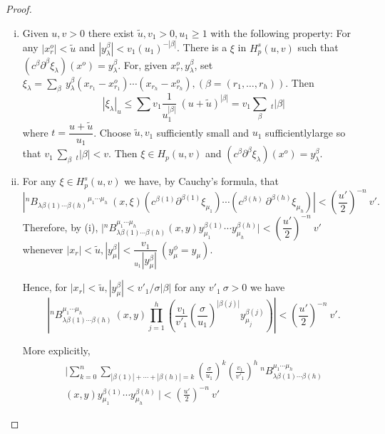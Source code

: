 \begin{proof}%
  \begin{enumerate}[(i)]
  \item Given $u, v > 0$ there exist $\tilde{u},  v_1 > 0,  u_1 \ge 1$
    with the following property: For any $| x^o_r | < \tilde{u}$ and
    $| y^\beta_\lambda | < v_1 (u_1)^{-| \beta |}$. There is a $\xi $
    in $H^s_p (u, v)$ such that $(c^\beta \partial^\beta \xi_\lambda)
    (x^o) = y^\beta_\lambda$. For,  given $x^o_r,  y^\beta_\lambda$,
    set $\xi_\lambda = \sum\limits_{\beta} ~ y_\lambda^\beta (x_{r_1}
    - x^o_{r_1}) \cdots (x_{r_h} - x^o_{r_h}),  (\beta = (r_1,
    \ldots,  r_h)) $. Then 
    $$
    | \xi_\lambda |_u \le \sum v_1 \frac{1}{u_1^{| \beta |}} ~(u +
    \tilde{u})^{| \beta |} = v_1 \sum_{\beta} ~ _t| \beta | 
    $$
    where $t = \dfrac{u + \tilde{u}}{u_1}$. Choose $\tilde{u},  v_1$
    sufficiently small and $u_1$ sufficiently\pageoriginale large so that $v_1  ~
    \sum\limits_\beta ~ _t| \beta | < v$. Then $\xi \in H_p (u, v)$
    and $(c^\beta \partial^\beta \xi_\lambda) (x^o) = y^\beta_\lambda$. 

  \item For any $\xi \in H^s_p (u, v)$ we have,  by Cauchy's formula,
    that 
{\fontsize{10pt}{12pt}\selectfont
    $$
\left| {}^n {B_{\lambda\beta(1) \cdots \beta(h)}}^{\mu_1 \cdots
      \mu_h}  ~ (x,  \xi) (c^{\beta(1)} \partial^{\beta(1)}
    \xi_{\mu_1}) \cdots (c^{\beta(h)} ~\partial^{\beta(h)}
    \xi_{\mu_h}) \right| < (\dfrac{u'}{2})^{-n} ~ v'.
$$}\relax 
     Therefore,  by
    (i), $\Big| {}^n B_{\lambda\beta(1) \cdots \beta(h)}^{\mu_1
      \cdots \mu_h} (x, y) y^{\beta(1)}_{\mu_1} \cdots
    y^{\beta(h)}_{\mu_h} \Big| < (\dfrac{u'}{2})^{-n} ~ v'$
    whenever 
    $| x_r | < \tilde{u},  | y^\beta_\mu | < \dfrac{v_1}{_{u_1} |
      y^\beta_\mu |} ~ (y^\phi_\mu = y_\mu)$. 
    
    Hence,  for $| x_r | < \tilde{u},  | y^\beta_\mu | < v'_1/\sigma |
    \beta | $ for any $v'_1 ~ \sigma > 0$ we have  
    $$
    \left| ^nB^{\mu_1 \cdots \mu_h}_{\lambda\beta(1) \cdots \beta(h)} ~
    (x, y) \prod_{j=1}^h \left( \frac{v_1}{v'_1}
    \left(\frac{\sigma}{u_1}\right)^{| \beta(j) | } y^{\beta(j)}_{\mu_j} \right)
    \right| < \left(\frac{u'}{2}\right)^{-n} ~v'. 
    $$

    More explicitly, 
    \begin{multline*}
    \Big| \sum_{k=0}^n  \sum_{| \beta(1) | + \cdots + | \beta(h) | =
      k} \left(\frac{\sigma}{u_1}\right)^k
    \left(\frac{v_1}{v'_1}\right)^h ~ ^nB^{\mu_1 
      \cdots \mu_h}_{\lambda\beta(1) \cdots \beta(h)}\\ 
    (x, y) y^{\beta(1)}_{\mu_1} \cdots y^{\beta(h)}_{\mu_h} ~ \Big| <
    \left(\frac{u'}{2}\right)^{-n} ~ v' 
    \end{multline*}


\end{enumerate}
\end{proof}
